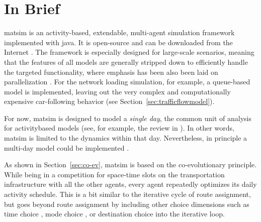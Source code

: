 \section{In Brief}
\label{sec:inbrief}
\gls{matsim} is an activity-based, extendable, multi-agent simulation \gls{framework} 
implemented with 
\gls{java}. It is open-source and can be downloaded from the Internet \citep[][]{MATSIM_Webpage_2015, SourceForge_Webpage_2015}. The \gls{framework} is especially designed for large-scale scenarios, meaning that the features of all models are generally stripped down to efficiently handle the targeted functionality, where emphasis has been also been laid on parallelization \citep[e.g.,][]{Dobler_TechRep_IVT_2011, Charypar_PhDThesis_2008}. For the network loading simulation, for example, a queue-based model is implemented, leaving out the very complex and computationally expensive car-following behavior (see Section~\ref{sec:trafficflowmodel}).

For now, \gls{matsim} is 
%
designed to model a \emph{single day}, the common unit of analysis for \gls{activitybased} models (see, for example, the review in \citet[][]{Bowman_TEC_2009_1}). In other words, \gls{matsim} is limited to the dynamics within that day. Nevertheless, in principle a multi-day model could be implemented \citep[][]{HorniEtAl_TechRep_IVT_2012_a}.

As shown in Section~\ref{sec:co-ev}, \gls{matsim} is based on the co-evolutionary principle. While being in a competition for space-time slots on the transportation infrastructure with all the other agents, every agent repeatedly optimizes its daily \gls{activity} schedule.  This is a bit similar to the iterative cycle of route assignment, but goes beyond route assignment by including other choice dimensions such as time choice \citep{BalmerRaneyEtAl2005act-times}, mode choice \citep{GretherEtAl2009SimpleModeChoiceIPL}, or destination choice \citep{HorniEtAl2011TrbLocationChoice} into the iterative loop.   

